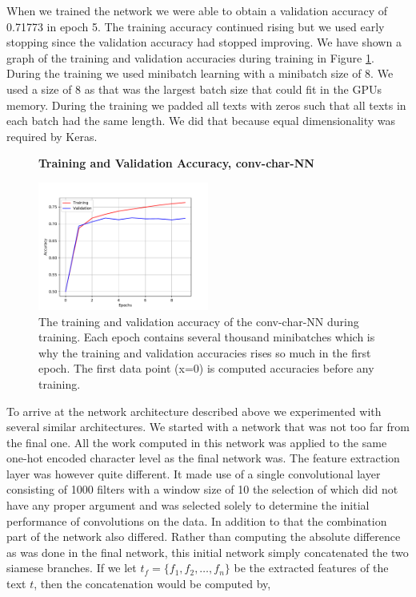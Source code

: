 When we trained the network we were able to obtain a validation accuracy of
0.71773 in epoch 5. The training accuracy continued rising but we used early
stopping since the validation accuracy had stopped improving. We have shown
a graph of the training and validation accuracies during training in Figure
\ref{fig:conv-char-NN-accuracies}. During the training we used minibatch
learning with a minibatch size of 8. We used a size of 8 as that was the largest
batch size that could fit in the GPUs memory. During the training we padded
all texts with zeros such that all texts in each batch had the same length. We
did that because equal dimensionality was required by Keras.

\begin{figure}
    \centering
    \textbf{Training and Validation Accuracy, \gls{conv-char-NN}}\par\medskip
    \includegraphics[width=0.5\textwidth]{./pictures/experiments/conv_char_nn/training_accuracy}
    \caption{The training and validation accuracy of the \gls{conv-char-NN}
    during training. Each epoch contains several thousand minibatches which is
    why the training and validation accuracies rises so much in the first epoch.
    The first data point (x=0) is computed accuracies before any training.}
    \label{fig:conv-char-NN-accuracies}
\end{figure}

To arrive at the network architecture described above we experimented with
several similar architectures. We started with a network that was not too
far from the final one. All the work computed in this network was applied
to the same one-hot encoded character level as the final network was. The
feature extraction layer was however quite different. It made use of a single
convolutional layer consisting of 1000 filters with a window size of 10 the
selection of which did not have any proper argument and was selected solely to
determine the initial performance of convolutions on the data. In addition to
that the combination part of the network also differed. Rather than computing
the absolute difference as was done in the final network, this initial network
simply concatenated the two siamese branches. If we let $t_f = \{f_1, f_2,
\dots, f_n\}$ be the extracted features of the text $t$, then the concatenation
would be computed by,

